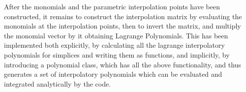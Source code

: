 \noindent
After the monomials and the parametric interpolation points have been constructed, it remains to construct the interpolation matrix by evaluating the monomials at the interpolation points, then to invert the matrix, and multiply the monomial vector by it obtaining Lagrange Polynomials. This has been implemented both explicitly, by calculating all the lagrange interpolatory polynomials for simplices and writing them as functions, and implicitly, by introducing a polynomial class, which has all the above functionality, and thus generates a set of interpolatory polynomials which can be evaluated and integrated analytically by the code.


